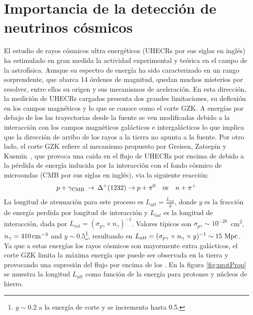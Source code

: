 \section{Importancia de la detecci\'on de neutrinos c\'osmicos}
%
%
%
%
El estudio de rayos c\'osmicos ultra energ\'eticos (UHECRs por sus siglas en ingl\'es) ha estimulado en gran medida la actividad experimental y te\'orica en el campo de la astrof\'isica.
Aunque su espectro de energ\'ia ha sido caracterizado en un rango sorprendente, que abarca 14 \'ordenes de magnitud, quedan muchos misterios por resolver, entre ellos su origen y sus mecanismos de aceleraci\'on.
En esta direcci\'on, la medici\'on de UHECRs cargados presenta dos grandes limitaciones, su deflexi\'on en los campos magn\'eticos y lo que se conoce como el corte GZK.
A energ\'ias por debajo de los  las trayectorias desde la fuente se ven modificadas debido a la interacci\'on con los campos magn\'eticos gal\'acticos e intergal\'acticos lo que implica que la direcci\'on de arribo de los rayos a la tierra no apunta a la fuente.
Por otro lado, el corte GZK refiere al mecanismo propuesto por Greisen, Zatsepin y Kusmin~\cite{cite:Greisen,cite:Zatsepin}, que provoca una caida en el flujo de UHECRs por encima de  debido a la p\'erdida de energ\'ia inducida por la interacci\'on con el fondo c\'osmico de microondas (CMB por sus siglas en ingl\'es), via la siguiente reacci\'on:
%
\begin{equation}
p + \gamma_{\rm CMB}\, \rightarrow\, \Delta^{+}(1232)  \rightarrow p +\pi^{0}\quad {\rm or}\quad n +\pi^{+}
\end{equation}
%
La longitud de atenuaci\'on para este proceso es $L_{att}=\frac{L_{int}}{y}$, donde $y$ es la fracci\'on de energ\'ia perdida por longitud de interacci\'on y $L_{int}$ es la longitud de interacci\'on, dada por $L_{int}=(\sigma_{p\gamma}\times n_{\gamma})^{-1}$.
Valores t\'ipicos son $\sigma_{p\gamma}\sim 10^{-28}$~cm$^{2}$, $ n_{\gamma}=410\,{\rm cm}^{-3}$ and $y\sim0.5$\footnote{$y\sim0.2$ a la energ\'ia de corte y se incrementa hasta 0.5.}, resultando en 
$L_{att}=(\sigma_{p\gamma}\times n_{\gamma}\times y)^{-1}\sim 15\mbox{ }{\rm Mpc}$. 
Ya que a estas energ\'ias los rayos c\'osmicos son mayormente extra gal\'acticos, el corte GZK limita la m\'axima energ\'ia que puede ser observada en la tierra y provocando una supresi\'on del flujo por encima de los .
En la figura \ref{fig:protProp} se muestra la longitud $L_{att}$ como funci\'on de la energ\'ia para protones y n\'ucleos de hierro. 
